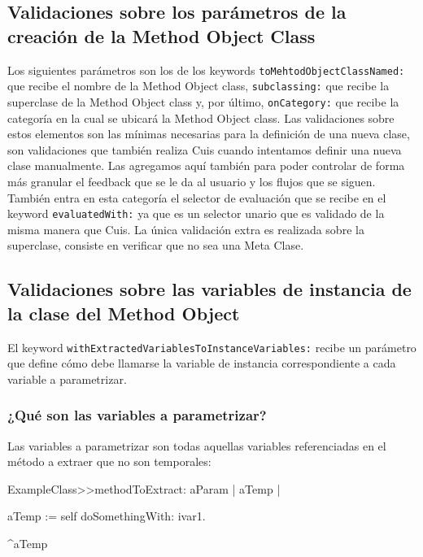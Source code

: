 \subsection*{Validaciones sobre los parámetros de la creación de la Method Object Class}

Los siguientes parámetros son los de los keywords
\lstinline{toMehtodObjectClassNamed:} que recibe el nombre de la Method Object
class, \lstinline{subclassing:} que recibe la superclase de la Method Object
class y, por último, \lstinline{onCategory:} que recibe la categoría en la cual
se ubicará la Method Object class. Las validaciones sobre estos elementos son
las mínimas necesarias para la definición de una nueva clase, son validaciones
que también realiza Cuis cuando intentamos definir una nueva clase
manualmente. Las agregamos aquí también para poder controlar de forma más
granular el feedback que se le da al usuario y los flujos que se siguen. También
entra en esta categoría el selector de evaluación que se recibe en el keyword
\lstinline{evaluatedWith:} ya que es un selector unario que es validado de la
misma manera que Cuis.
La única validación extra es realizada sobre la superclase, consiste en
verificar que no sea una Meta Clase.



\subsection*{Validaciones sobre las variables de instancia de la clase del Method Object}

El keyword \lstinline{withExtractedVariablesToInstanceVariables:} recibe un
parámetro que define cómo debe llamarse la variable de instancia correspondiente
a cada variable a parametrizar.

\subsubsection*{¿Qué son las variables a parametrizar?}
Las variables a parametrizar son todas aquellas variables referenciadas en el
método a extraer que no son temporales:

\begin{code}
ExampleClass>>methodToExtract: aParam | aTemp |

    aTemp := self doSomethingWith: ivar1.
    
    ^aTemp
\end{code}

